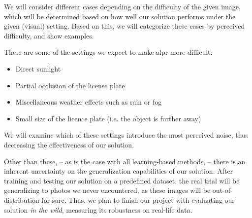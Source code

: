 We will consider different cases depending on the difficulty of the given image,
which will be determined based on how well our solution performs under
the given (visual) setting. Based on this, we will categorize these cases by
perceived difficulty, and show examples.

These are some of the settings we expect to make \ac{alpr} more difficult:
\begin{itemize}
    \item Direct sunlight 
    \item Partial occlusion of the license plate 
    \item Miscellaneous weather effects such as rain or fog
    \item Small size of the licence plate (i.e. the object is further away)
\end{itemize}

We will examine which of these settings introduce the most perceived noise, thus
decreasing the effectiveness of our solution.

Other than these, -- as is the case with all learning-based methods, -- there is
an inherent uncertainty on the generalization capabilities of our solution.
After training and testing our solution on a predefined dataset, the real trial
will be generalizing to photos we never encountered, as these images will be
out-of-distribution for sure. Thus, we plan to finish our project with
evaluating our solution \textit{in the wild}, measuring its robustness on
real-life data.
